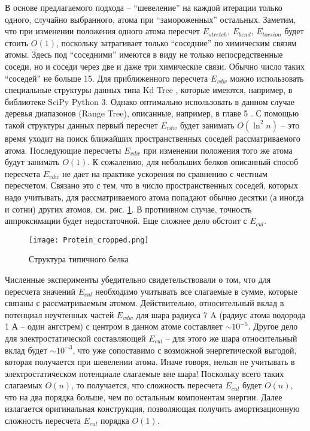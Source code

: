   В основе предлагаемого подхода -- ``шевеление'' на каждой итерации только 
  одного, случайно выбранного, атома при ``замороженных'' остальных. Заметим, 
  что при изменении положения одного атома пересчет $E_{stretch} $, $E_{bend} 
  $, $E_{torsion} $ будет стоить ${O}\left( 1 \right)$, поскольку 
  затрагивает только ``соседние'' по химическим связям атомы. Здесь под ``соседними'' 
  имеются в виду не только непосредственные соседи, но и соседи через две и даже три химические связи. Обычно число таких 
  ``соседей'' не больше 15. Для приближенного пересчета $E_{vdw} $ можно использовать 
  специальные структуры данных типа Kd Tree \cite{de2000computational}, которые имеются, например, в 
  библиотеке SciPy Python 3. Однако оптимально использовать в данном случае 
  деревья диапазонов (Range Tree), описанные, например, в главе 5 \cite{de2000computational}. С помощью такой структуры данных первый пересчет $E_{vdw} $ будет занимать 
  ${O}\left( {\ln ^2n} \right)$ -- это время уходит на поиск ближайших 
  пространственных соседей рассматриваемого атома. Последующие пересчеты 
  $E_{vdw} $ при изменении положения того же атома будут занимать ${
  O}\left( 1 \right)$. К сожалению, для небольших белков описанный способ пересчета $E_{vdw}$ не дает на практике ускорения по сравнению с честным пересчетом. Связано это с тем, что в число пространственных соседей, которых надо учитывать, для рассматриваемого атома попадают обычно десятки (а иногда и сотни) других атомов, см. рис. \ref{belok}. В протиивном случае, точность аппроксимации будет недостаточной. Еще сложнее дело обстоит с $E_{cul} $. 

  \begin{figure}
  \begin{center}
  \texttt{[image: Protein\_cropped.png]}
  \end{center}
  \caption{Структура типичного белка}
  \label{belok}
  \end{figure}
   
  Численные эксперименты убедительно свидетельствовали о том, что для пересчета значений $E_{cul} $ необходимо учитывать все слагаемые в сумме, которые связаны с рассматриваемым атомом. Действительно, относительный вклад в потенциал неучтенных частей $E_{vdw}$ для шара радиуса 7 A (радиус атома водорода 1 А -- один ангстрем) с центром в данном атоме составляет $\sim 10^{-5}$. Другое дело для электростатической составляющей $E_{cul}$ -- для этого же шара относительный вклад будет $\sim 10^{-3}$, что уже сопоставимо с возможной энергетической выгодой, которая получается при шевелении атома. Иначе говоря, нельзя не учитывать в электростатическом потенциале слагаемые вне шара! Поскольку всего таких слагаемых 
  ${O}\left( n \right)$, то получается, что сложность пересчета $E_{cul} $ будет ${
  O}\left( n \right)$, что на два порядка больше, чем по остальным 
  компонентам энергии. Далее излагается  оригинальная конструкция, позволяющая получить амортизационную сложность пересчета 
  $E_{cul} $ порядка ${O}\left( 1 \right)$. 

